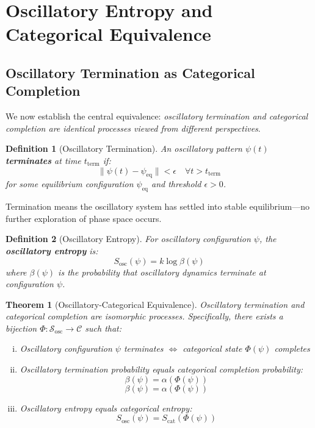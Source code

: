 \documentclass[12pt,a4paper]{article}
\newtheorem{theorem}{Theorem}
\newtheorem{definition}{Definition}
\begin{document}
\section{Oscillatory Entropy and Categorical Equivalence}

\subsection{Oscillatory Termination as Categorical Completion}

We now establish the central equivalence: \textit{oscillatory termination and categorical completion are identical processes viewed from different perspectives}.

\begin{definition}[Oscillatory Termination]
\label{def:oscillatory_termination}
An oscillatory pattern $\psi(t)$ \textbf{terminates} at time $t_{\text{term}}$ if:
\begin{equation}
\|\psi(t) - \psi_{\text{eq}}\| < \epsilon \quad \forall t > t_{\text{term}}
\end{equation}
for some equilibrium configuration $\psi_{\text{eq}}$ and threshold $\epsilon > 0$.
\end{definition}

Termination means the oscillatory system has settled into stable equilibrium—no further exploration of phase space occurs.

\begin{definition}[Oscillatory Entropy]
\label{def:oscillatory_entropy}
For oscillatory configuration $\psi$, the \textbf{oscillatory entropy} is:
\begin{equation}
S_{\text{osc}}(\psi) = k \log \beta(\psi)
\label{eq:oscillatory_entropy}
\end{equation}
where $\beta(\psi)$ is the probability that oscillatory dynamics terminate at configuration $\psi$.
\end{definition}

\begin{theorem}[Oscillatory-Categorical Equivalence]
\label{thm:oscillatory_categorical_equivalence}
Oscillatory termination and categorical completion are isomorphic processes. Specifically, there exists a bijection $\Phi: \mathcal{S}_{\text{osc}} \to \mathcal{C}$ such that:
\begin{enumerate}[(i)]
\item Oscillatory configuration $\psi$ terminates $\iff$ categorical state $\Phi(\psi)$ completes
\item Oscillatory termination probability equals categorical completion probability: \\ 
\[ \beta(\psi) = \alpha(\Phi(\psi)) \]
\begin{equation}
\beta(\psi) = \alpha(\Phi(\psi))
\end{equation}
\item Oscillatory entropy equals categorical entropy:
\begin{equation}
S_{\text{osc}}(\psi) = S_{\text{cat}}(\Phi(\psi))
\end{equation}
\end{enumerate}
\end{theorem}
\end{document}
